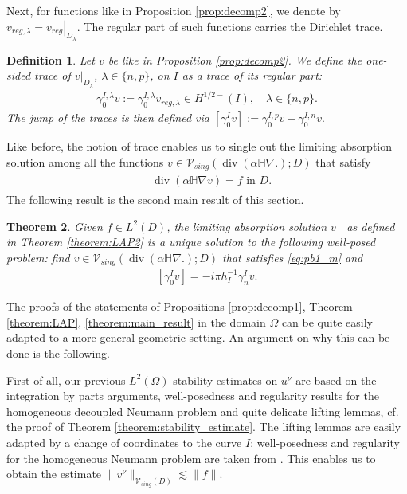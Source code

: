 \documentclass[report]{elsarticle}
\newtheorem{theorem}{Theorem}[section]
\newtheorem{definition}[theorem]{Definition}
\numberwithin{theorem}{section}
\begin{document}
Next, for functions like in Proposition \ref{prop:decomp2}, we denote by $v_{reg,\lambda}=\left. v_{reg}\right|_{D_{\lambda}}$. The regular part of such functions carries the Dirichlet trace. 
\begin{definition}
	\label{def:trace_general}
	Let $v$ be like in Proposition \ref{prop:decomp2}. We define the one-sided trace of $\left. v\right|_{D_{\lambda}}$, $\lambda\in \{n,p\}$, on $I$ as a trace of its regular part:
	\begin{align*}
		\gamma_{0}^{I,\lambda}v:=\gamma_0^{I,\lambda}v_{reg,\lambda}\in H^{1/2-}(I), \quad \lambda\in \{n,p\}.
	\end{align*}
	The jump of the traces is then defined via $
	[\gamma_{0}^{I}v]:=\gamma_0^{I,p}v-\gamma_0^{I,n}v.$
\end{definition}
Like before, the notion of trace enables us to single out the limiting absorption solution among all the functions $v\in \mathcal{V}_{sing}(\operatorname{div}(\alpha\mathbb{H}\nabla.); D)$ that satisfy 
\begin{align}
	\label{eq:pb1_m}
	\begin{split}
		&\operatorname{div}(\alpha\mathbb{H}\nabla v)=f \text{ in }D.
	\end{split}
\end{align}
The following result is the second main result of this section. 
\begin{theorem}
	\label{theorem:main_result2}
	Given $f\in L^2(D)$, the limiting absorption solution $v^+$ as defined in Theorem \ref{theorem:LAP2} is a unique solution to the following well-posed problem: find $v\in \mathcal{V}_{sing}(\operatorname{div}(\alpha\mathbb{H}\nabla .); D)$ that satisfies \eqref{eq:pb1_m} and 
	\begin{align}
		\label{eq:traces2}
		[\gamma_0^{I}v]=-i\pi h_{I}^{-1}\gamma_n^{I}v. 
	\end{align}
\end{theorem}
The proofs of the statements of Propositions \ref{prop:decomp1}, Theorem \ref{theorem:LAP}, \ref{theorem:main_result} in the domain $\Omega$ can be quite easily adapted to a more general geometric setting. An argument on why this can be done is the following. 

First of all, our previous $L^2(\Omega)$-stability estimates on $u^{\nu}$ are based on the integration by parts arguments, well-posedness and regularity results for the homogeneous decoupled Neumann problem and quite delicate lifting lemmas, cf. the proof of Theorem \ref{theorem:stability_estimate}. The lifting lemmas are easily adapted by a change of coordinates to the curve $I$; well-posedness and regularity for the homogeneous Neumann problem are taken from \cite{baouendi_goulaouic}. This enables us to obtain the estimate  $\|v^{\nu}\|_{\mathcal{V}_{sing}(D)}\lesssim \|f\|$.
\end{document}
